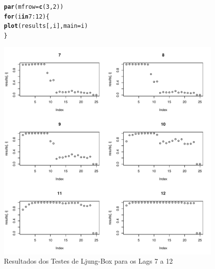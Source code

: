 \documentclass{article}\usepackage[]{graphicx}\usepackage[]{color}
\makeatletter
\def\maxwidth{ %
  \ifdim\Gin@nat@width>\linewidth
    \linewidth
  \else
    \Gin@nat@width
  \fi
}
\newcommand{\hlnum}[1]{\textcolor[rgb]{0.686,0.059,0.569}{#1}}%
\newcommand{\hlopt}[1]{\textcolor[rgb]{0,0,0}{#1}}%
\newcommand{\hlstd}[1]{\textcolor[rgb]{0.345,0.345,0.345}{#1}}%
\newcommand{\hlkwa}[1]{\textcolor[rgb]{0.161,0.373,0.58}{\textbf{#1}}}%
\newcommand{\hlkwc}[1]{\textcolor[rgb]{0.333,0.667,0.333}{#1}}%
\newcommand{\hlkwd}[1]{\textcolor[rgb]{0.737,0.353,0.396}{\textbf{#1}}}%
\newenvironment{kframe}{%
 \def\at@end@of@kframe{}%
 \ifinner\ifhmode%
  \def\at@end@of@kframe{\end{minipage}}%
  \begin{minipage}{\columnwidth}%
 \fi\fi%
 \def\FrameCommand##1{\hskip\@totalleftmargin \hskip-\fboxsep
 \colorbox{shadecolor}{##1}\hskip-\fboxsep
     \hskip-\linewidth \hskip-\@totalleftmargin \hskip\columnwidth}%
 \MakeFramed {\advance\hsize-\width
   \@totalleftmargin\z@ \linewidth\hsize
   \@setminipage}}%
 {\par\unskip\endMakeFramed%
 \at@end@of@kframe}
\newenvironment{knitrout}{}{} %
\makeatother
\begin{document}
            \begin{figure}[H]
            \caption{Resultados dos Testes de Ljung-Box para os Lags 7 a 12}
            \centering
\begin{knitrout}
\color{fgcolor}\begin{kframe}
\begin{alltt}
\hlkwd{par}\hlstd{(}\hlkwc{mfrow} \hlstd{=} \hlkwd{c}\hlstd{(}\hlnum{3}\hlstd{,}\hlnum{2}\hlstd{))}
\hlkwa{for} \hlstd{(i} \hlkwa{in} \hlnum{7}\hlopt{:}\hlnum{12}\hlstd{)\{}
  \hlkwd{plot}\hlstd{(results[,i],} \hlkwc{main}\hlstd{=i)}
\hlstd{\}}
\end{alltt}
\end{kframe}
\includegraphics[width=\maxwidth]{figure/unnamed-chunk-33-1} 

\end{knitrout}
            \end{figure}
            
\end{document}
